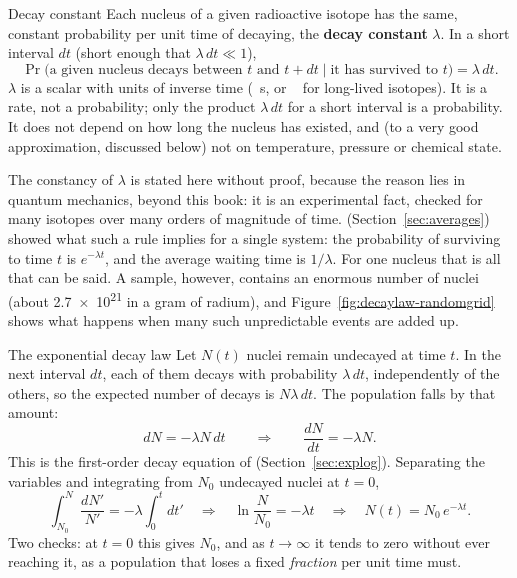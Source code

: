 \begin{defbox}{Decay constant}
Each nucleus of a given radioactive isotope has the same, constant probability per unit time of
decaying, the \textbf{decay constant} $\lambda$. In a short interval $dt$ (short enough that
$\lambda\,dt\ll1$),
\[
\Pr\big(\text{a given nucleus decays between }t\text{ and }t+dt\;\big|\;\text{it has survived to }t\big)=\lambda\,dt .
\]
$\lambda$ is a scalar with units of inverse time (\si{\per\second}, or \si{\per\year} for long-lived
isotopes). It is a rate, not a probability; only the product $\lambda\,dt$ for a short interval is a
probability. It does not depend on how long the nucleus has existed, and (to a very good
approximation, discussed below) not on temperature, pressure or chemical state.
\end{defbox}

The constancy of $\lambda$ is stated here without proof, because the reason lies in quantum
mechanics, beyond this book: it is an experimental fact, checked for many isotopes over many orders of
magnitude of time.  (Section~\ref{sec:averages}) showed what such a rule implies for a
single system: the probability of surviving to time $t$ is $e^{-\lambda t}$, and the average waiting
time is $1/\lambda$. For one nucleus that is all that can be said. A sample, however, contains an
enormous number of nuclei (about \num{2.7e21} in a gram of radium), and Figure~\ref{fig:decaylaw-randomgrid}
shows what happens when many such unpredictable events are added up.

\begin{figure}[htbp]
\centering
{}
\end{figure}

\begin{derivbox}{The exponential decay law}
Let $N(t)$ nuclei remain undecayed at time $t$. In the next interval $dt$, each of them decays with
probability $\lambda\,dt$, independently of the others, so the expected number of decays is
$N\lambda\,dt$. The population falls by that amount:
\[
dN=-\lambda N\,dt\qquad\Longrightarrow\qquad \frac{dN}{dt}=-\lambda N .
\]
This is the first-order decay equation of  (Section~\ref{sec:explog}). Separating
the variables and integrating from $N_0$ undecayed nuclei at $t=0$,
\[
\int_{N_0}^{N}\frac{dN'}{N'}=-\lambda\int_0^t dt'\quad\Longrightarrow\quad\ln\frac{N}{N_0}=-\lambda t
\quad\Longrightarrow\quad N(t)=N_0\,e^{-\lambda t}.
\]
Two checks: at $t=0$ this gives $N_0$, and as $t\to\infty$ it tends to zero without ever reaching it,
as a population that loses a fixed \emph{fraction} per unit time must.
\end{derivbox}

